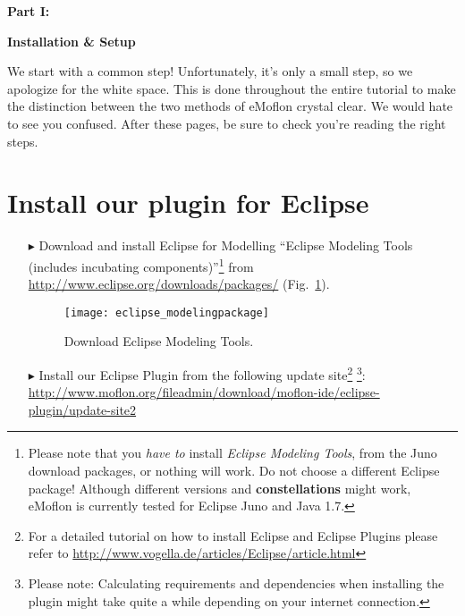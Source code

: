 {\bf \huge Part I:}

\vspace{0.5cm}

{\bf \Huge Installation \& Setup }

\vspace{0.5cm}

\genHeader

We start with a common step! Unfortunately, it's only a small step, so we apologize for the white space. This is done throughout the entire tutorial to make the distinction between the two methods of eMoflon crystal clear. We would hate to see you confused. After these pages, be sure to check you're reading the right steps.

\section{Install our plugin for Eclipse}
\label{stepTwo}
\begin{enumerate}
\item[$\blacktriangleright$] Download and install Eclipse for Modelling ``Eclipse Modeling Tools (includes incubating components)''\footnote{Please note that you \emph{have to} install \emph{Eclipse Modeling Tools}, from the Juno download packages, or nothing will work.  Do not choose a different Eclipse package!  Although different versions and {\bf constellations} might work, eMoflon is currently tested for Eclipse Juno and Java 1.7.} from \url{http://www.eclipse.org/downloads/packages/} (Fig.~\ref{fig_downloadModelingPackage}).

\begin{figure}[htbp]
	\centering
  	\texttt{[image: eclipse\_modelingpackage]}
	\caption{Download Eclipse Modeling Tools.}
	\label{fig_downloadModelingPackage}
\end{figure}

\item[$\blacktriangleright$] Install our Eclipse Plugin from the following update site\footnote{For a detailed tutorial on how to install Eclipse and Eclipse Plugins please refer to \url{http://www.vogella.de/articles/Eclipse/article.html}} 
\footnote{Please note: Calculating requirements and dependencies when installing the plugin might take quite a while depending on your internet connection.}:
\url{http://www.moflon.org/fileadmin/download/moflon-ide/eclipse-plugin/update-site2}

\end{enumerate}

